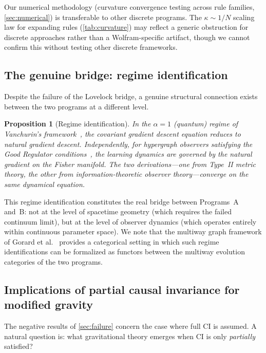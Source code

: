 \documentclass[11pt]{article}
\newtheorem{proposition}[theorem]{Proposition}
\theoremstyle{definition}
\theoremstyle{remark}
\begin{document}
Our numerical methodology (curvature convergence testing across rule
families, \cref{sec:numerical}) is transferable to other discrete
programs.
The $\kappa \sim 1/N$ scaling law for expanding rules
(\cref{tab:curvature}) may reflect a generic obstruction for discrete
approaches rather than a Wolfram-specific artifact, though we cannot
confirm this without testing other discrete frameworks.

\subsection{The genuine bridge: regime identification}
\label{sec:genuine-bridge}

Despite the failure of the Lovelock bridge, a genuine structural
connection exists between the two programs at a different level.

\begin{proposition}[Regime identification]
\label{prop:regime-identification}
In the $\alpha = 1$ (quantum) regime of Vanchurin's
framework~\cite{Vanchurin2025}, the covariant gradient descent equation
reduces to natural gradient descent.
Independently, for hypergraph observers satisfying the Good Regulator
conditions~\cite{companion_amari}, the learning dynamics are governed by
the natural gradient on the Fisher manifold.
The two derivations---one from Type~II metric theory, the other from
information-theoretic observer theory---converge on the same dynamical
equation.
\end{proposition}

This regime identification constitutes the real bridge between Programs~A
and~B: not at the level of spacetime geometry (which requires the failed
continuum limit), but at the level of observer dynamics (which operates
entirely within continuous parameter space).
We note that the multiway graph framework of
Gorard et al.~\cite{GorardNamuduriArsiwalla2021} provides a
categorical setting in which such regime identifications can be
formalized as functors between the multiway evolution categories of
the two programs.

\subsection{Implications of partial causal invariance for modified gravity}
\label{sec:partial-CI}

The negative results of \cref{sec:failure} concern the case where full
CI is assumed.  A natural question is: what gravitational theory
emerges when CI is only \emph{partially} satisfied?
\end{document}
